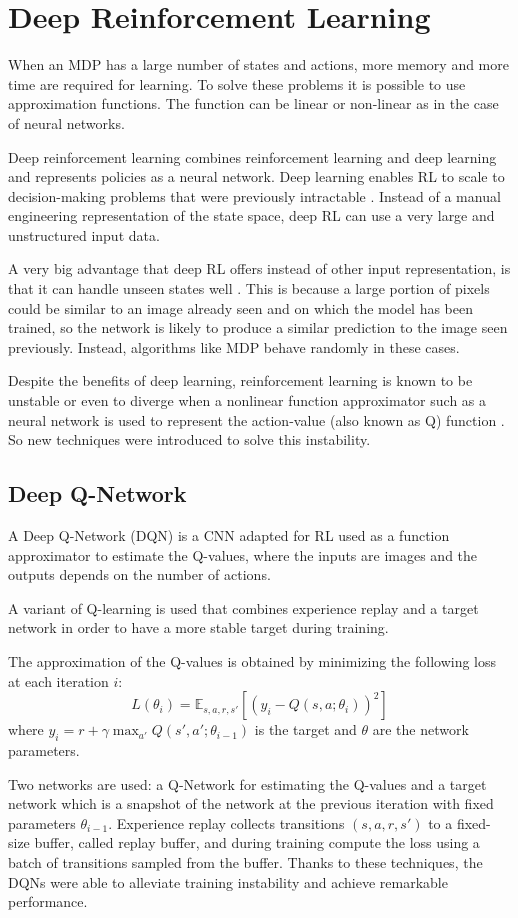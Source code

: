 \section{Deep Reinforcement Learning}
\label{sec:drl}
When an MDP has a large number of states and actions, more memory and more time are required for learning.
To solve these problems it is possible to use approximation functions.
The function can be linear \cite{melo2008analysis} or non-linear as in the case of neural networks.

Deep reinforcement learning \cite{arulkumaran2017deep} combines reinforcement learning and deep learning and represents policies as a neural network.
%
Deep learning enables RL to scale to decision-making problems that were previously intractable \cite{arulkumaran2017deep}.
Instead of a manual engineering representation of the state space, deep RL can use a very large and unstructured input data.

\pagebreak
A very big advantage that deep RL offers instead of other input representation,
is that it can handle unseen states well \cite{mnih2013playing} \cite{karpathy2016deep}.
This is because a large portion of pixels could be similar to an image already seen and on which the model has been trained, so the network is likely to produce a similar prediction to the image seen previously. Instead, algorithms like MDP behave randomly in these cases.

Despite the benefits of deep learning, reinforcement learning is known to be unstable or even to diverge when a nonlinear function approximator such as a neural network is used to represent the action-value (also known as Q) function \cite{mnih2015human}.
So new techniques were introduced to solve this instability.

\subsection{Deep Q-Network}
A Deep Q-Network (DQN) \cite{mnih2013playing} is a CNN adapted for RL used as a function approximator to estimate the Q-values,
where the inputs are images and the outputs depends on the number of actions.

A variant of Q-learning is used that combines experience replay and a target network in order to have a more stable target during training. 

The approximation of the Q-values is obtained by minimizing the following loss at each iteration $i$:
\begin{equation}
    L(\theta_i) = \mathbb{E}_{s, a, r, s'} [ ( y_i - Q(s, a; \theta_i))^2 ]
\end{equation}
where $y_i = r + \gamma \max_{a'} Q(s', a'; \theta_{i-1})$ is the target and $\theta$ are the network parameters.

Two networks are used: a Q-Network for estimating the Q-values and
a target network which is a snapshot of the network at the previous iteration with fixed parameters $\theta_{i- 1}$.
%
Experience replay collects transitions $(s, a, r, s')$ to a fixed-size buffer, called replay buffer, and during training 
compute the loss using a batch of transitions sampled from the buffer.
%
Thanks to these techniques, the DQNs were able to alleviate training instability and achieve remarkable performance.
